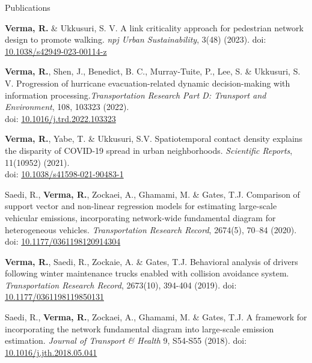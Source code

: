 \documentclass{CV} %
\begin{document}
\begin{rSection}{Publications}
\begin{etaremune}
        \item \textbf{Verma, R.} \& Ukkusuri, S. V. A link criticality approach for pedestrian network design to promote walking. \textit{npj Urban Sustainability}, 3(48) (2023). doi: \href{https://doi.org/10.1038/s42949-023-00114-z}{10.1038/s42949-023-00114-z}
        
        \item \textbf{Verma, R.}, Shen, J., Benedict, B. C., Murray-Tuite, P., Lee, S. \& Ukkusuri, S. V. Progression of hurricane evacuation-related dynamic decision-making with information processing.\textit{Transportation Research Part D: Transport and Environment}, 108, 103323 (2022).\\doi: \href{https://doi.org/10.1016/j.trd.2022.103323}{10.1016/j.trd.2022.103323}
        
        \item \textbf{Verma, R.}, Yabe, T. \& Ukkusuri, S.V. Spatiotemporal contact density explains the disparity of COVID-19 spread in urban neighborhoods. \textit{Scientific Reports}, 11(10952) (2021).
        \\ doi: \href{https://www.nature.com/articles/s41598-021-90483-1}{10.1038/s41598-021-90483-1}
        
        \item Saedi, R., \textbf{Verma, R.}, Zockaei, A., Ghamami, M. \& Gates, T.J. Comparison of support vector and non-linear regression models for estimating large-scale vehicular emissions, incorporating network-wide fundamental diagram for heterogeneous vehicles. \textit{Transportation Research Record}, 2674(5), 70–84 (2020). doi: \href{https://journals.sagepub.com/doi/abs/10.1177/0361198120914304}{10.1177/0361198120914304}
        
        \item \textbf{Verma, R.}, Saedi, R., Zockaie, A. \& Gates, T.J. Behavioral analysis of drivers following winter maintenance trucks enabled with collision avoidance system. \textit{Transportation Research Record}, 2673(10), 394-404 (2019). doi: \href{https://journals.sagepub.com/doi/abs/10.1177/0361198119850131}{10.1177/0361198119850131}
        
        \item Saedi, R., \textbf{Verma, R.}, Zockaei, A., Ghamami, M. \& Gates, T.J. A framework for incorporating the network fundamental diagram into large-scale emission estimation. \textit{Journal of Transport \& Health} 9, S54-S55 (2018). doi: \href{https://www.sciencedirect.com/science/article/abs/pii/S2214140518302263}{10.1016/j.jth.2018.05.041}
        

\end{etaremune}
\end{rSection}
\end{document}
